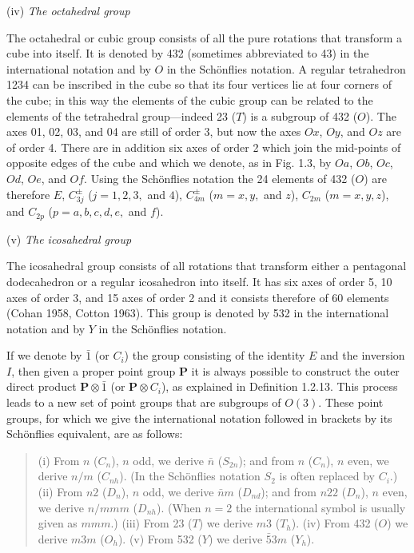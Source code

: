 \documentclass[11pt,a4paper,twoside,openright]{book}
\begin{document}
(iv) \textit{The octahedral group}

The octahedral or cubic group consists of all the pure rotations that transform a cube into itself. It is denoted by 432 (sometimes abbreviated to 43) in the international notation and by $O$ in the Schönflies notation. A regular tetrahedron 1234 can be inscribed in the cube so that its four vertices lie at four corners of the cube; in this way the elements of the cubic group can be related to the elements of the tetrahedral group—indeed 23 ($T$) is a subgroup of 432 ($O$). The axes 01, 02, 03, and 04 are still of order 3, but now the axes $Ox$, $Oy$, and $Oz$ are of order 4. There are in addition six axes of order 2 which join the mid-points of opposite edges of the cube and which we denote, as in Fig. 1.3, by $Oa$, $Ob$, $Oc$, $Od$, $Oe$, and $Of$. Using the Schönflies notation the 24 elements of 432 ($O$) are therefore $E$, $C_{3j}^{\pm}$ ($j = 1, 2, 3,$ and $4$), $C_{4m}^{\pm}$ ($m = x, y,$ and $z$), $C_{2m}$ ($m = x, y, z$), and $C_{2p}$ ($p = a, b, c, d, e,$ and $f$).

(v) \textit{The icosahedral group}

The icosahedral group consists of all rotations that transform either a pentagonal dodecahedron or a regular icosahedron into itself. It has six axes of order 5, 10 axes of order 3, and 15 axes of order 2 and it consists therefore of 60 elements (Cohan 1958, Cotton 1963). This group is denoted by 532 in the international notation and by $Y$ in the Schönflies notation.

If we denote by $\bar{1}$ (or $C_{i}$) the group consisting of the identity $E$ and the inversion $I$, then given a proper point group $\mathbf{P}$ it is always possible to construct the outer direct product $\mathbf{P} \otimes \bar{1}$ (or $\mathbf{P} \otimes C_{i}$), as explained in Definition 1.2.13. This process leads to a new set of point groups that are subgroups of $O(3)$. These point groups, for which we give the international notation followed in brackets by its Schönflies equivalent, are as follows:

\begin{quote}(i) From $n$ ($C_{n}$), $n$ odd, we derive $\bar{n}$ ($S_{2n}$); and from $n$ ($C_{n}$), $n$ even, we derive $n/m$ ($C_{nh}$). (In the Schönflies notation $S_{2}$ is often replaced by $C_{i}$.) (ii) From $n2$ ($D_{n}$), $n$ odd, we derive $\bar{n}m$ ($D_{nd}$); and from $n22$ ($D_{n}$), $n$ even, we derive $n/mmm$ ($D_{nh}$). (When $n = 2$ the international symbol is usually given as $mmm$.) (iii) From 23 ($T$) we derive $m3$ ($T_{h}$). (iv) From 432 ($O$) we derive $m3m$ ($O_{h}$). (v) From 532 ($Y$) we derive $\bar{5}3m$ ($Y_{h}$).\end{quote}
\end{document}
